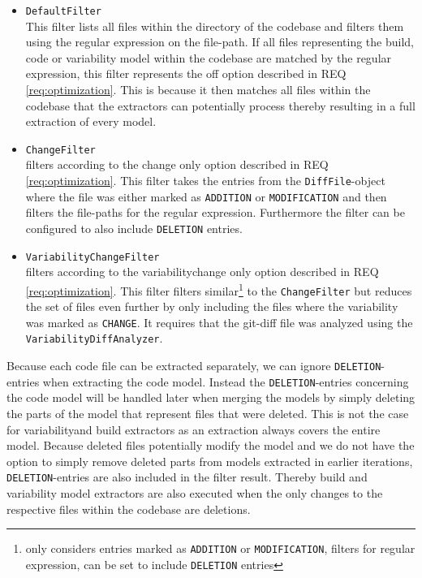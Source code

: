 \documentclass[a4paper]{article}
\begin{document}
\begin{itemize}
\item \texttt{DefaultFilter} \\
    This filter lists all files within the directory of the codebase and filters them using the regular expression on the file-path. If all files representing the build, code or variability model within the codebase are matched by the regular expression, this filter represents the off option described in REQ \ref{req:optimization}. This is because it then matches all files within the codebase that the extractors can potentially process thereby resulting in a full extraction of every model.
\item \texttt{ChangeFilter} \\
    filters according to the change only option described in REQ \ref{req:optimization}. This filter takes the entries from the \texttt{DiffFile}-object where the file was either marked as \texttt{ADDITION} or \texttt{MODIFICATION} and then filters the file-paths for the regular expression. Furthermore the filter can be configured to also include \texttt{DELETION} entries.
\item \texttt{VariabilityChangeFilter} \\
    filters according to the variabilitychange only option described in REQ \ref{req:optimization}. This filter filters similar\footnote{only considers entries marked as \texttt{ADDITION} or \texttt{MODIFICATION}, filters for regular expression, can be set to include \texttt{DELETION} entries} to the \texttt{ChangeFilter}  but reduces the set of files even further by only including the files where the variability was marked as \texttt{CHANGE}. It requires that the git-diff file was analyzed using the \texttt{Variability\-Diff\-Analyzer}.
\end{itemize}

Because each code file can be extracted separately, we can ignore \texttt{DELETION}-entries when extracting the code model. Instead the \texttt{DELETION}-entries concerning the code model will be handled later when merging the models by simply deleting the parts of the model that represent files that were deleted. This is not the case for variabilityand build extractors as an extraction always covers the entire model. Because deleted files potentially modify the model and we do not have the option to simply remove deleted parts from models extracted in earlier iterations, \texttt{DELETION}-entries are also included in the filter result. Thereby  build and variability model extractors are also executed when the only changes to the respective files within the codebase are deletions.
\end{document}
